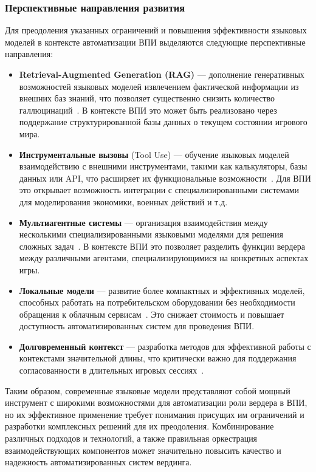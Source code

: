 \subsubsection{Перспективные направления развития}

Для преодоления указанных ограничений и повышения эффективности языковых моделей в контексте автоматизации ВПИ выделяются следующие перспективные направления:

\begin{itemize}
    \item \textbf{Retrieval-Augmented Generation (RAG)} — дополнение генеративных возможностей языковых моделей извлечением фактической информации из внешних баз знаний, что позволяет существенно снизить количество галлюцинаций~\cite{lewis2020retrieval}. В контексте ВПИ это может быть реализовано через поддержание структурированной базы данных о текущем состоянии игрового мира.

    \item \textbf{Инструментальные вызовы} (Tool Use) — обучение языковых моделей взаимодействию с внешними инструментами, такими как калькуляторы, базы данных или API, что расширяет их функциональные возможности~\cite{schick2023toolformer}. Для ВПИ это открывает возможность интеграции с специализированными системами для моделирования экономики, военных действий и т.д.

    \item \textbf{Мультиагентные системы} — организация взаимодействия между несколькими специализированными языковыми моделями для решения сложных задач~\cite{park2023generative}. В контексте ВПИ это позволяет разделить функции вердера между различными агентами, специализирующимися на конкретных аспектах игры.

    \item \textbf{Локальные модели} — развитие более компактных и эффективных моделей, способных работать на потребительском оборудовании без необходимости обращения к облачным сервисам~\cite{liu2023llama}. Это снижает стоимость и повышает доступность автоматизированных систем для проведения ВПИ.

    \item \textbf{Долговременный контекст} — разработка методов для эффективной работы с контекстами значительной длины, что критически важно для поддержания согласованности в длительных игровых сессиях~\cite{peng2023yarn}.
\end{itemize}

Таким образом, современные языковые модели представляют собой мощный инструмент с широкими возможностями для автоматизации роли вердера в ВПИ, но их эффективное применение требует понимания присущих им ограничений и разработки комплексных решений для их преодоления. Комбинирование различных подходов и технологий, а также правильная оркестрация взаимодействующих компонентов может значительно повысить качество и надежность автоматизированных систем вердинга.
